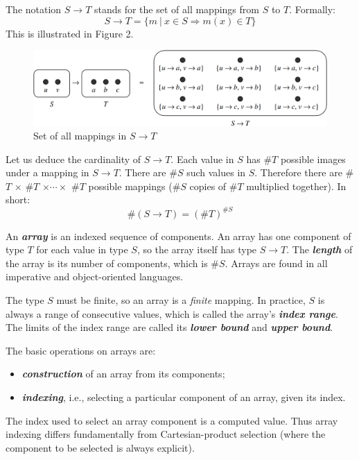 \documentclass{article}
\begin{document}
The notation $S \rightarrow T$ stands for the set of all mappings from $S$ to $T$. Formally:
\begin{equation}
    S \rightarrow T = \{m\ |\ x \in S \Rightarrow m(x) \in T\}
\end{equation}
This is illustrated in Figure 2.

\begin{figure}[h!]
    \centering
    \includegraphics[width=.5\textwidth]{img/Fig2.3.png}
    \caption{Set of all mappings in $S \rightarrow T$}
    \label{fig:my_label}
\end{figure}

Let us deduce the cardinality of $S \rightarrow T$. Each value in $S$ has \#$T$ possible images under a mapping in $S \rightarrow T$. There are \#$S$ such values in $S$. Therefore there are \#$T$ $\times$ \#$T$ $\times \cdots \times$ \#$T$ possible mappings (\#$S$ copies of \#$T$ multiplied together). In short:
\begin{equation}
    \text{\#}(S \rightarrow T) = (\text{\#}T)^{\text{\#}S}
\end{equation}

An \textbf{\textit{array}} is an indexed sequence of components. An array has one component of type $T$ for each value in type $S$, so the array itself has type $S \rightarrow T$. The \textbf{\textit{length}} of the array is its number of components, which is \#$S$. Arrays are found in all imperative and object-oriented languages.

The type $S$ must be finite, so an array is a \textit{finite} mapping. In practice, $S$ is always a range of consecutive values, which is called the array’s \textit{\textbf{index range}}. The limits of the index range are called its \textbf{\textit{lower bound}} and \textbf{\textit{upper bound}}.

The basic operations on arrays are:
\begin{itemize}
    \item \textbf{\textit{construction}} of an array from its components;
    \item \textbf{\textit{indexing}}, i.e., selecting a particular component of an array, given its index.
\end{itemize}
The index used to select an array component is a computed value. Thus array indexing differs fundamentally from Cartesian-product selection (where the component to be selected is always explicit).
\end{document}

